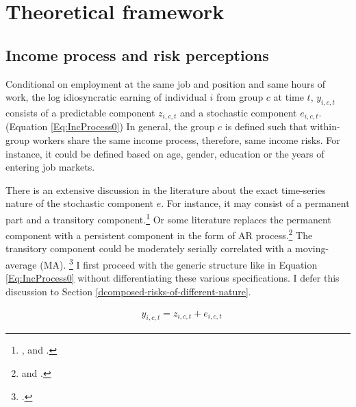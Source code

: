 
    \hypertarget{theoretical-framework}{%
\section{Theoretical framework}\label{theoretical-framework}}

\hypertarget{income-process-and-risk-perceptions}{%
\subsection{Income process and risk
perceptions}\label{income-process-and-risk-perceptions}}

Conditional on employment at the same job and position and same hours of work, the log idiosyncratic earning of individual \(i\) from group \(c\) at time \(t\), $y_{i,c,t}$ consists of a predictable component $z_{i,c,t}$ and a stochastic component $e_{i,c,t}$. (Equation \ref{Eq:IncProcess0}) In general, the group \(c\) is defined such that within-group workers share the same income process, therefore, same income risks. For instance, it could be defined based on age, gender, education or the years of entering job markets. 

There is an extensive discussion in the literature about the exact time-series nature of the stochastic component $e$. For instance, it may consist of a permanent part and a transitory component.\footnote{\cite{gottschalk1994growth}, and \cite{carroll1997nature}.} Or some literature replaces the permanent component with a persistent component in the form of AR process.\footnote{\cite{storesletten2004cyclical} and \cite{guvenen_empirical_2009}.} The transitory component could be moderately serially correlated with a moving-average (MA). \footnote{\cite{meghir2004income}.} I first proceed with the generic structure like in Equation \ref{Eq:IncProcess0} without differentiating these various specifications. I defer this discussion to Section \ref{dcomposed-risks-of-different-nature}. 

\begin{equation}
\begin{split}
\label{Eq:IncProcess0}
& y_{i,c,t} = z_{i,c,t}+ e_{i,c,t} 
\end{split}
\end{equation}


